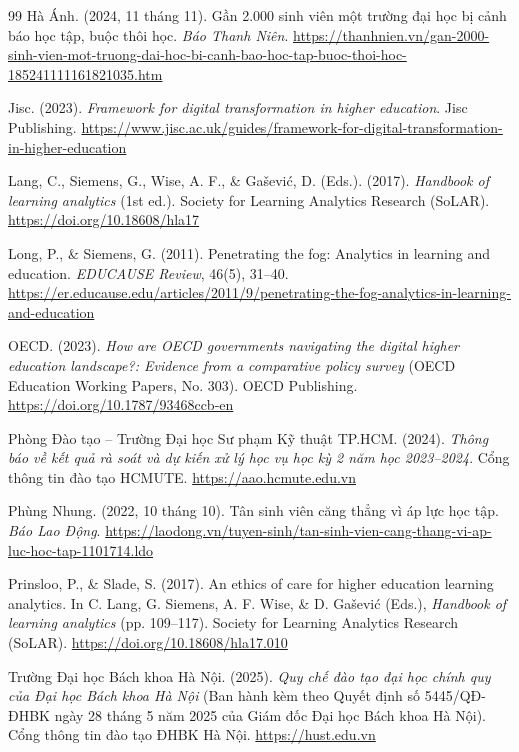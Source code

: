 \begin{thebibliography}{99}
Hà Ánh. (2024, 11 tháng 11). Gần 2.000 sinh viên một trường đại học bị cảnh báo học tập, buộc thôi học. \textit{Báo Thanh Niên}. \url{https://thanhnien.vn/gan-2000-sinh-vien-mot-truong-dai-hoc-bi-canh-bao-hoc-tap-buoc-thoi-hoc-185241111161821035.htm}

Jisc. (2023). \textit{Framework for digital transformation in higher education}. Jisc Publishing. \url{https://www.jisc.ac.uk/guides/framework-for-digital-transformation-in-higher-education}

Lang, C., Siemens, G., Wise, A. F., \& Ga{\v{s}}evi{\'c}, D. (Eds.). (2017). \textit{Handbook of learning analytics} (1st ed.). Society for Learning Analytics Research (SoLAR). \url{https://doi.org/10.18608/hla17}

Long, P., \& Siemens, G. (2011). Penetrating the fog: Analytics in learning and education. \textit{EDUCAUSE Review}, 46(5), 31--40. \url{https://er.educause.edu/articles/2011/9/penetrating-the-fog-analytics-in-learning-and-education}

OECD. (2023). \textit{How are OECD governments navigating the digital higher education landscape?: Evidence from a comparative policy survey} (OECD Education Working Papers, No. 303). OECD Publishing. \url{https://doi.org/10.1787/93468ccb-en}

Phòng Đào tạo -- Trường Đại học Sư phạm Kỹ thuật TP.HCM. (2024). \textit{Thông báo về kết quả rà soát và dự kiến xử lý học vụ học kỳ 2 năm học 2023--2024}. Cổng thông tin đào tạo HCMUTE. \url{https://aao.hcmute.edu.vn}

Phùng Nhung. (2022, 10 tháng 10). Tân sinh viên căng thẳng vì áp lực học tập. \textit{Báo Lao Động}. \url{https://laodong.vn/tuyen-sinh/tan-sinh-vien-cang-thang-vi-ap-luc-hoc-tap-1101714.ldo}

Prinsloo, P., \& Slade, S. (2017). An ethics of care for higher education learning analytics. In C. Lang, G. Siemens, A. F. Wise, \& D. Ga{\v{s}}evi{\'c} (Eds.), \textit{Handbook of learning analytics} (pp. 109--117). Society for Learning Analytics Research (SoLAR). \url{https://doi.org/10.18608/hla17.010}

Trường Đại học Bách khoa Hà Nội. (2025). \textit{Quy chế đào tạo đại học chính quy của Đại học Bách khoa Hà Nội} (Ban hành kèm theo Quyết định số 5445/QĐ-ĐHBK ngày 28 tháng 5 năm 2025 của Giám đốc Đại học Bách khoa Hà Nội). Cổng thông tin đào tạo ĐHBK Hà Nội. \url{https://hust.edu.vn}


\end{thebibliography}
